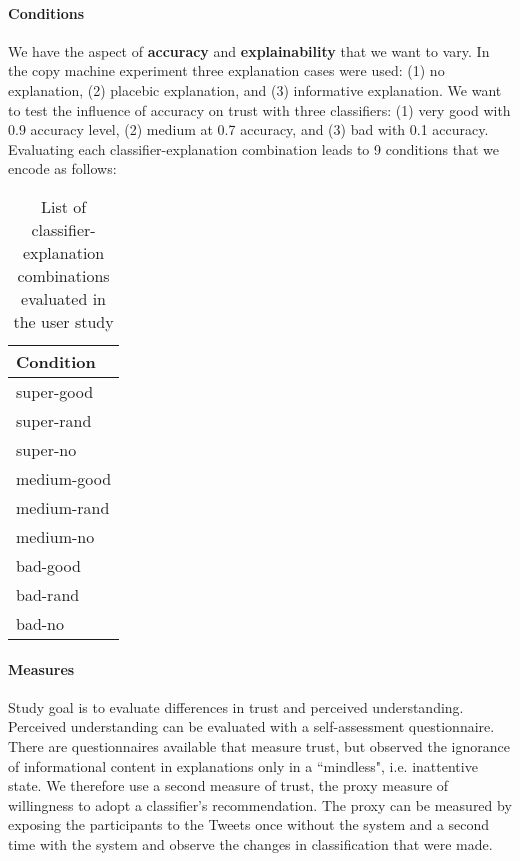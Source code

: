 \paragraph{Conditions}
We have the aspect of \textbf{accuracy} and \textbf{explainability} that we want to vary. In the copy machine experiment \cite{langer1978mindlessness} three explanation cases were used: (1) no explanation, (2) placebic explanation, and (3) informative explanation. We want to test the influence of accuracy on trust with three classifiers: (1) very good with 0.9 accuracy level, (2) medium at 0.7 accuracy, and (3) bad with 0.1 accuracy. Evaluating each classifier-explanation combination leads to 9 conditions that we encode as follows:
\begin{table}
	\centering
	\begin{tabular}{l}
		\textbf{Condition}\\ \midrule
		super-good\\
		super-rand\\
		super-no\\
		medium-good\\
		medium-rand\\
		medium-no\\
		bad-good\\
		bad-rand\\
		bad-no\\ \bottomrule
	\end{tabular}
	\caption{List of classifier-explanation combinations evaluated in the user study}
	\label{tab:conditions}
\end{table}

\paragraph{Measures}
Study goal is to evaluate differences in trust and perceived understanding.\newline
Perceived understanding can be evaluated with a self-assessment questionnaire.\newline
There are questionnaires available that measure trust, but \cite{langer1978mindlessness} observed the ignorance of informational content in explanations only in a ``mindless", i.e. inattentive state. We therefore use a second measure of trust, the proxy measure of willingness to adopt a classifier's recommendation. The proxy can be measured by exposing the participants to the Tweets once without the system and a second time with the system and observe the changes in classification that were made. 







